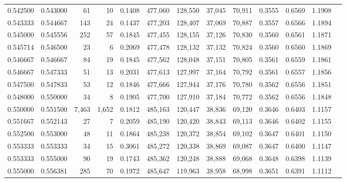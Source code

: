 \begin{tabular}{rrrrrrrrrrrrr}
0.542500 & 0.543000 &     61 &    10 &                                     0.1408 & 477,060 & 128,550 &  37,045 &  70,911 & 0.3555 & 0.6569 & 1.1908 \\
0.543333 & 0.544667 &    143 &    24 &                                     0.1437 & 477,203 & 128,407 &  37,069 &  70,887 & 0.3557 & 0.6566 & 1.1894 \\
0.545000 & 0.545556 &    252 &    57 &                                     0.1845 & 477,455 & 128,155 &  37,126 &  70,830 & 0.3560 & 0.6561 & 1.1871 \\
0.545714 & 0.546500 &     23 &     6 &                                     0.2069 & 477,478 & 128,132 &  37,132 &  70,824 & 0.3560 & 0.6560 & 1.1869 \\
0.546667 & 0.546667 &     84 &    19 &                                     0.1845 & 477,562 & 128,048 &  37,151 &  70,805 & 0.3561 & 0.6559 & 1.1861 \\
0.546667 & 0.547333 &     51 &    13 &                                     0.2031 & 477,613 & 127,997 &  37,164 &  70,792 & 0.3561 & 0.6557 & 1.1856 \\
0.547500 & 0.547833 &     53 &    12 &                                     0.1846 & 477,666 & 127,944 &  37,176 &  70,780 & 0.3562 & 0.6556 & 1.1851 \\
0.548000 & 0.550000 &     34 &     8 &                                     0.1905 & 477,700 & 127,910 &  37,184 &  70,772 & 0.3562 & 0.6556 & 1.1848 \\
0.550000 & 0.551500 &  7,463 & 1,652 &                                     0.1812 & 485,163 & 120,447 &  38,836 &  69,120 & 0.3646 & 0.6403 & 1.1157 \\
0.551667 & 0.552143 &     27 &     7 &                                     0.2059 & 485,190 & 120,420 &  38,843 &  69,113 & 0.3646 & 0.6402 & 1.1155 \\
0.552500 & 0.553000 &     48 &    11 &                                     0.1864 & 485,238 & 120,372 &  38,854 &  69,102 & 0.3647 & 0.6401 & 1.1150 \\
0.553333 & 0.553333 &     34 &    15 &                                     0.3061 & 485,272 & 120,338 &  38,869 &  69,087 & 0.3647 & 0.6400 & 1.1147 \\
0.553333 & 0.555000 &     90 &    19 &                                     0.1743 & 485,362 & 120,248 &  38,888 &  69,068 & 0.3648 & 0.6398 & 1.1139 \\
0.555000 & 0.556381 &    285 &    70 &                                     0.1972 & 485,647 & 119,963 &  38,958 &  68,998 & 0.3651 & 0.6391 & 1.1112 \\

\end{tabular}
